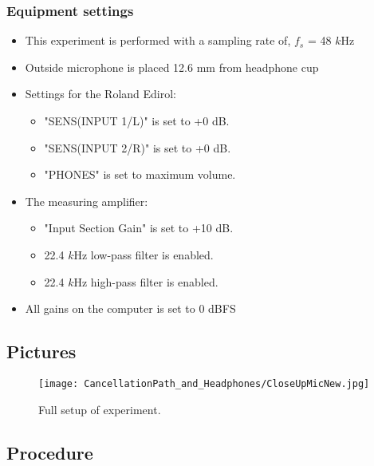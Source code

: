 \subsubsection{Equipment settings}
\begin{itemize}
	\item This experiment is performed with a sampling rate of, $f_{s}$ = 48 $k$Hz
	\item Outside microphone is placed 12.6 mm from headphone cup 
	\item Settings for the Roland Edirol:
	\begin{itemize}
		\item "SENS(INPUT 1/L)" is set to +0 dB.
		\item "SENS(INPUT 2/R)" is set to +0 dB.
		\item "PHONES" is set to maximum volume. %
	\end{itemize}		
	\item The measuring amplifier:
		\begin{itemize}
			\item "Input Section Gain" is set to +10 dB.
			\item 22.4 $k$Hz low-pass filter is enabled.
			\item 22.4 $k$Hz high-pass filter is enabled.
		\end{itemize}
	\item All gains on the computer is set to 0 dBFS
\end{itemize}

\subsection{Pictures}
\begin{figure}[H]
	\centering
	\texttt{[image: CancellationPath\_and\_Headphones/CloseUpMicNew.jpg]}
	\caption{Full setup of experiment.}
	\label{CloseupHeadphone}
\end{figure}


\subsection{Procedure}
